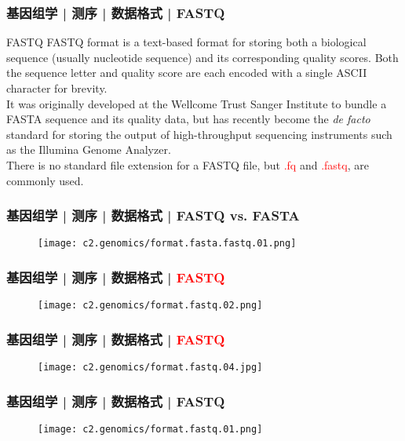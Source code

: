 \begin{frame}
  \frametitle{基因组学 | 测序 | 数据格式 | FASTQ}
  \begin{block}{FASTQ}
FASTQ format is a text-based format for storing both a biological sequence (usually nucleotide sequence) and its corresponding quality scores. Both the sequence letter and quality score are each encoded with a single ASCII character for brevity.\\
\vspace{1em}
It was originally developed at the Wellcome Trust Sanger Institute to bundle a FASTA sequence and its quality data, but has recently become the \textit{de facto} standard for storing the output of high-throughput sequencing instruments such as the Illumina Genome Analyzer.\\
\vspace{1em}
There is no standard file extension for a FASTQ file, but \textcolor{red}{.fq} and \textcolor{red}{.fastq}, are commonly used.
  \end{block}
\end{frame}
    
\begin{frame}
  \frametitle{基因组学 | 测序 | 数据格式 | FASTQ vs. FASTA}
  \begin{figure}
    \centering
    \texttt{[image: c2.genomics/format.fasta.fastq.01.png]}
  \end{figure}
\end{frame}

\begin{frame}
  \frametitle{基因组学 | 测序 | 数据格式 | \textcolor{red}{FASTQ}}
  \begin{figure}
    \centering
    \texttt{[image: c2.genomics/format.fastq.02.png]}
  \end{figure}
\end{frame}
    
\begin{frame}
  \frametitle{基因组学 | 测序 | 数据格式 | \textcolor{red}{FASTQ}}
  \begin{figure}
    \centering
    \texttt{[image: c2.genomics/format.fastq.04.jpg]}
  \end{figure}
\end{frame}
    
\begin{frame}
  \frametitle{基因组学 | 测序 | 数据格式 | FASTQ}
  \begin{figure}
    \centering
    \texttt{[image: c2.genomics/format.fastq.01.png]}
  \end{figure}
\end{frame}
    
